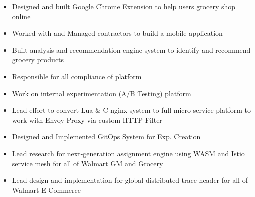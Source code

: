 \documentclass[10pt,a4paper,ragged2e]{altacv}
\begin{document}

\begin{fullwidth}
\makecvheader
\end{fullwidth}



\begin{itemize}
\item Designed and built Google Chrome Extension to help users grocery shop online
\item Worked with and Managed contractors to build a mobile application
\item Built analysis and recommendation engine system to identify and recommend grocery products
\item Responsible for all compliance of platform
\end{itemize}

\divider

\begin{itemize}
\item Work on internal experimentation (A/B Testing) platform
\item Lead effort to convert Lua \& C nginx system to full micro-service platform to work with Envoy Proxy via custom HTTP Filter
\item Designed and Implemented GitOps System for Exp. Creation
\item Lead research for next-generation assignment engine using WASM and Istio service mesh for all of Walmart GM and Grocery
\item Lead design and implementation for global distributed trace header for all of Walmart E-Commerce
\end{itemize}
\end{document}
